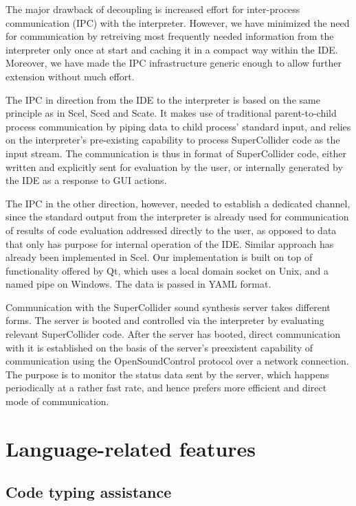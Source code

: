\documentclass[a4paper,10pt]{article}
\begin{document}
The major drawback of decoupling is increased effort for inter-process communication (IPC) with the
interpreter. However, we have minimized the need for communication by retreiving most frequently
needed information from the interpreter only once at start and caching it in a compact way within
the IDE. Moreover, we have made the IPC infrastructure generic enough to allow further extension
without much effort.

The IPC in direction from the IDE to the interpreter is based on the same principle as in Scel,
Sced and Scate. It makes use of traditional parent-to-child process communication by piping data to
child process' standard input, and relies on the interpreter's pre-existing capability to
process SuperCollider code as the input stream. The communication is thus in format of SuperCollider
code, either written and explicitly sent for evaluation by the user, or internally generated by
the IDE as a response to GUI actions.

The IPC in the other direction, however, needed to establish a dedicated channel, since the standard
output from the interpreter is already used for communication of results of code evaluation
addressed directly to the user, as opposed to data that only has purpose for internal operation of
the IDE. Similar approach has already been implemented in Scel. Our implementation is built on top
of functionality offered by Qt, which uses a local domain socket on Unix, and a named pipe on
Windows. The data is passed in YAML format.

Communication with the SuperCollider sound synthesis server takes different forms. The server is
booted and controlled via the interpreter by evaluating relevant SuperCollider code. After the
server has booted, direct communication with it is established on the basis of the server's
preexistent capability of communication using the OpenSoundControl protocol over a network
connection. The purpose is to monitor the status data sent by the server, which happens periodically
at a rather fast rate, and hence prefers more efficient and direct mode of communication.

\section{Language-related features}

\subsection{Code typing assistance}
\end{document}
